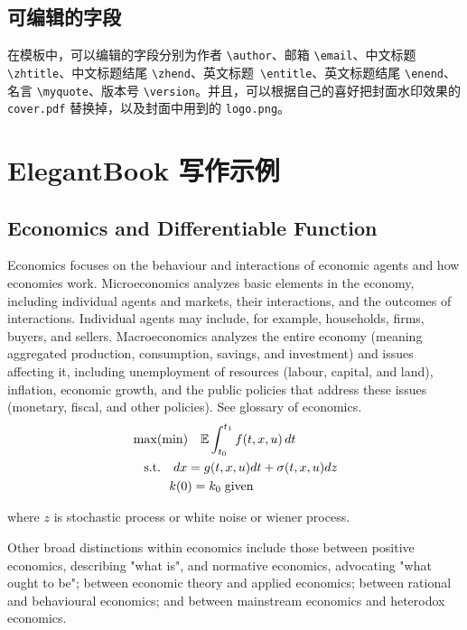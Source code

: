 \documentclass{elegantbook}
\begin{document}
\section{可编辑的字段}
在模板中，可以编辑的字段分别为作者 \verb|\author|、邮箱 \verb|\email|、中文标题 \verb|\zhtitle|、中文标题结尾 \verb|\zhend|、英文标题\verb| \entitle|、英文标题结尾 \verb|\enend|、名言 \verb|\myquote|、版本号 \verb|\version|。并且，可以根据自己的喜好把封面水印效果的 \verb|cover.pdf| 替换掉，以及封面中用到的 \verb|logo.png|。

\chapter{ElegantBook 写作示例}

\section{Economics and Differentiable Function}

Economics focuses on the behaviour and interactions of economic agents and how economies work. Microeconomics analyzes basic elements in the economy, including individual agents and markets, their interactions, and the outcomes of interactions. Individual agents may include, for example, households, firms, buyers, and sellers. Macroeconomics analyzes the entire economy (meaning aggregated production, consumption, savings, and investment) and issues affecting it, including unemployment of resources (labour, capital, and land), inflation, economic growth, and the public policies that address these issues (monetary, fiscal, and other policies). See glossary of economics.
\begin{align*}
   &\max(\min)\quad \mathbb{E}\int_{t_0}^{t_1}f(t,x,u)\,dt\\
   &\quad\mbox{s.t.} \quad dx=g(t,x,u)dt+\sigma(t,x,u)dz\\
   &\quad \hspace{2.em} k(0)=k_0\;\text{given}
\end{align*}

where $z$ is stochastic process or white noise or wiener process.

Other broad distinctions within economics include those between positive economics, describing "what is", and normative economics, advocating "what ought to be"; between economic theory and applied economics; between rational and behavioural economics; and between mainstream economics and heterodox economics.
\end{document}
